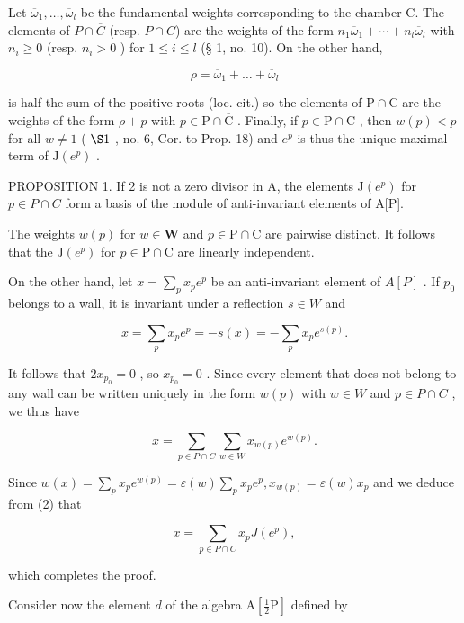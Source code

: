 Let \(\overline{\omega}_{1},\ldots,\overline{\omega}_{l}\) be the fundamental weights corresponding to the chamber C. The elements of \(P\cap\overline{C}\) (resp. \(P\cap C\)) are the weights of the form \(n_{1}\overline{\omega}_{1}+\cdots+n_{l}\overline{\omega}_{l}\) with \(n_{i}\geqslant0\) (resp. \(n_{i}>0\) ) for \(1\leqslant i\leqslant l\) (§ 1, no. 10). On the other hand,

\[
\rho = \overline {{\omega}} _ {1} + \dots + \overline {{\omega}} _ {l}
\]

is half the sum of the positive roots (loc. cit.) so the elements of \(\mathrm{P} \cap \mathrm{C}\) are the weights of the form \(\rho + p\) with \(p \in \mathrm{P} \cap \overline{\mathrm{C}}\) . Finally, if \(p \in \mathrm{P} \cap \mathrm{C}\) , then \(w(p) < p\) for all \(w \neq 1\) ( \(\S 1\) , no. 6, Cor. to Prop. 18) and \(e^p\) is thus the unique maximal term of \(\mathrm{J}(e^p)\) .

PROPOSITION 1. If 2 is not a zero divisor in A, the elements \(\mathrm{J}(e^{p})\) for \(p \in P \cap C\) form a basis of the module of anti-invariant elements of A{[}P{]}.

The weights \(w(p)\) for \(w \in \mathbf{W}\) and \(p \in \mathrm{P} \cap \mathrm{C}\) are pairwise distinct. It follows that the \(\mathrm{J}(e^p)\) for \(p \in \mathrm{P} \cap \mathrm{C}\) are linearly independent.

On the other hand, let \(x = \sum_{p} x_{p} e^{p}\) be an anti-invariant element of \(A[P]\) . If \(p_{0}\) belongs to a wall, it is invariant under a reflection \(s \in W\) and

\[
x = \sum_ {p} x _ {p} e ^ {p} = - s (x) = - \sum_ {p} x _ {p} e ^ {s (p)}.
\]

It follows that \(2x_{p_{0}} = 0\) , so \(x_{p_{0}} = 0\) . Since every element that does not belong to any wall can be written uniquely in the form \(w(p)\) with \(w \in W\) and \(p \in P \cap C\) , we thus have

\[
x = \sum_ {p \in P \cap C} \sum_ {w \in W} x _ {w (p)} e ^ {w (p)}.\tag{2}
\]

Since \(w(x) = \sum_{p} x_{p} e^{w(p)} = \varepsilon(w) \sum_{p} x_{p} e^{p}, x_{w(p)} = \varepsilon(w) x_{p}\) and we deduce from (2) that

\[
x = \sum_ {p \in P \cap C} x _ {p} J (e ^ {p}),
\]

which completes the proof.

Consider now the element \(d\) of the algebra \(\mathrm{A}[\frac{1}{2}\mathrm{P}]\) defined by

